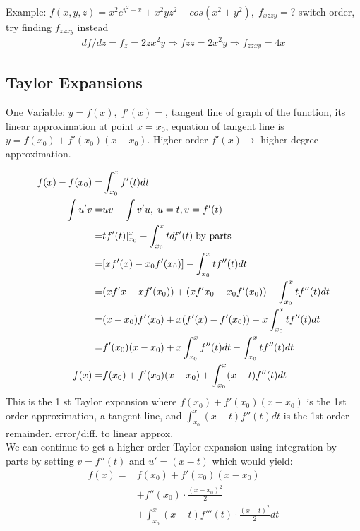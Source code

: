\documentclass{article}
\begin{document}
        Example: $f(x,y,z) = x^2e^{y^2-x}+x^2yz^2-cos(x^2+y^2),\; f_{xzzy} = ?$ switch order, try finding $f_{zzxy}$ instead
        \begin{align}
            df/dz = f_z = 2zx^2y \Rightarrow fzz = {2x^2y} \Rightarrow f_{zzxy} = 4x
        \end{align}
    \subsection{Taylor Expansions}
        One Variable: $y = f(x),\;f'(x) = $, tangent line of graph of the function, its linear approximation at point $x=x_0$, equation of tangent line is $y = f(x_0) + f'(x_0)(x-x_0)$. Higher order $f'(x)\rightarrow$ higher degree approximation. 
        
        \begin{align}
            f(x) - f(x_0) =& \int^{x}_{x_0} f'(t)dt\\
            \int u'v =& uv - \int v'u,\;u=t,v=f'(t)\\
            =&tf'(t)|_{x_0}^{x} - \int^{x}_{x_0}tdf'(t)\text{\;by parts}\\
            =&[xf'(x) - x_0 f'(x_0)] - \int^{x}_{x_0}tf''(t)dt\\
            =&(xf'x - xf'(x_0)) + (xf'x_0 - x_0f'(x_0))- \int^{x}_{x_0}tf''(t)dt\\
            =&(x-x_0)f'(x_0)+x(f'(x)-f'(x_0)) - x\int^{x}_{x_0}tf''(t)dt\\
            =&f'(x_0)(x-x_0) + x\int^{x}_{x_0}f''(t)dt - \int^{x}_{x_0}tf''(t)dt\\
            f(x) =& f(x_0) + f'(x_0)(x-x_0) + \int^{x}_{x_0}(x-t)f''(t)dt\\
        \end{align}
        This is the 1 st Taylor expansion where $f(x_0) + f'(x_0)(x-x_0)$ is the 1st order approximation, a tangent line, and $\int^{x}_{x_0}(x-t)f''(t)dt$ is the 1st order remainder. error/diff. to linear approx.\\
        
        We can continue to get a higher order Taylor expansion using integration by parts by setting $v=f''(t)$ and $u' = (x-t)$ which would yield:
        \begin{align}
            f(x) =& f(x_0)+f'(x_0)(x-x_0)\\\nonumber
            &+ f''(x_0)\cdot\frac{(x-x_0)^2}{2} \\\nonumber
            &+ \int^{x}_{x_0}(x-t)f'''(t)\cdot\frac{(x-t)^2}{2}dt
        \end{align}
        
\end{document}
